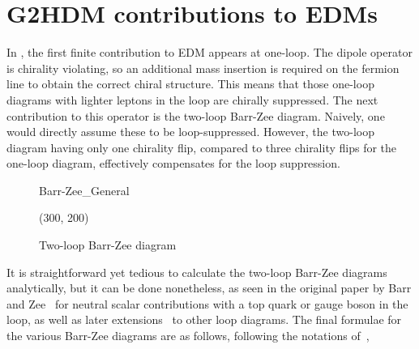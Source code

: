 \section{G2HDM contributions to EDMs}

In {\gthdm}, the first finite contribution to EDM appears at one-loop.
The dipole operator is chirality violating, so an additional mass insertion is required on the fermion line to obtain the correct chiral structure.
This means that those one-loop diagrams with lighter leptons in the loop are chirally suppressed.
The next contribution to this operator is the two-loop Barr-Zee diagram. 
Naively, one would directly assume these to be loop-suppressed. 
However, the two-loop diagram having only one chirality flip, compared to three chirality flips for the one-loop diagram, 
effectively compensates for the loop suppression.

\begin{figure}[p]
	\centering
	\begin{fmffile}{Barr-Zee_General}
		\begin{fmfgraph*}(300, 200)
			\fmffreeze
			\fmffreeze
		\end{fmfgraph*}
	\end{fmffile}

	\caption{Two-loop Barr-Zee diagram}
	\label{fig:BarrZee_general}
\end{figure}

It is straightforward yet tedious to calculate the two-loop Barr-Zee diagrams analytically, but it can be done nonetheless, 
as seen in the original paper by Barr and Zee~\cite{BarrZee} for neutral scalar contributions with a top quark or gauge boson in the loop,
as well as later extensions~\cite{MoreBarrZee} to other loop diagrams.
The final formulae for the various Barr-Zee diagrams are as follows, following the notations of~\cite{Abe},

